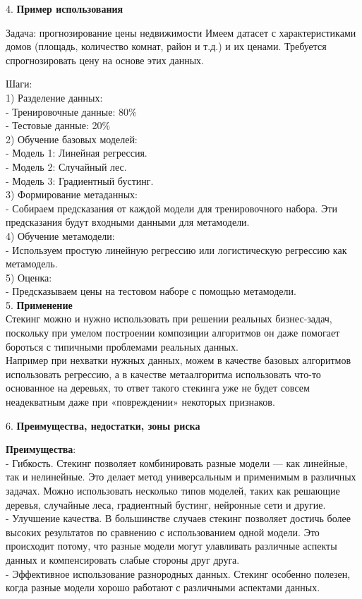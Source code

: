 4. \textbf{Пример использования}

Задача: прогнозирование цены недвижимости
Имеем датасет с характеристиками домов (площадь, количество комнат, район и т.д.) и их ценами. Требуется спрогнозировать цену на основе этих данных.

Шаги:  \\
1) Разделение данных:  \\
- Тренировочные данные: 80\%  \\
- Тестовые данные: 20\% \\
2) Обучение базовых моделей:\\
- Модель 1: Линейная регрессия.  \\
- Модель 2: Случайный лес.  \\
- Модель 3: Градиентный бустинг.  \\
3) Формирование метаданных:\\
- Собираем предсказания от каждой модели для тренировочного набора. Эти предсказания будут входными данными для метамодели.  \\
4) Обучение метамодели: \\
- Используем простую линейную регрессию или логистическую регрессию как метамодель.  \\
5) Оценка:\\
- Предсказываем цены на тестовом наборе с помощью метамодели.  \\

5. \textbf{Применение}\\
Стекинг можно и нужно использовать при решении реальных бизнес-задач, поскольку при умелом построении композиции алгоритмов он даже помогает бороться с типичными проблемами реальных данных. \\
Например при нехватки нужных данных, можем в качестве базовых алгоритмов использовать регрессию, а в качестве метаалгоритма использовать что-то основанное на деревьях, то ответ такого стекинга уже не будет совсем неадекватным даже при «повреждении» некоторых признаков.

6. \textbf{Преимущества, недостатки, зоны риска}

\textbf{Преимущества}:\\
- Гибкость. Стекинг позволяет комбинировать разные модели — как линейные, так и нелинейные. Это делает метод универсальным и применимым в различных задачах. Можно использовать несколько типов моделей, таких как решающие деревья, случайные леса, градиентный бустинг, нейронные сети и другие.\\
- Улучшение качества. В большинстве случаев стекинг позволяет достичь более высоких результатов по сравнению с использованием одной модели. Это происходит потому, что разные модели могут улавливать различные аспекты данных и компенсировать слабые стороны друг друга.\\
- Эффективное использование разнородных данных. Стекинг особенно полезен, когда разные модели хорошо работают с различными аспектами данных. \\

